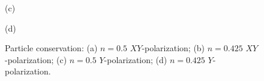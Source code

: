 \begin{figure}[h!]
\begin{minipage}[h]{0.5\linewidth}
\end{minipage}
\begin{minipage}[h]{0.5\linewidth}
 (c) \\
\end{minipage}
\hfill
\begin{minipage}[h]{0.5\linewidth}
 (d) \\
\end{minipage}
\caption{Particle conservation: (a) $n=0.5$ $XY$-polarization; (b) $n=0.425$ $XY$-polarization; (c) $n=0.5$ $Y$-polarization; (d) $n=0.425$ $Y$-polarization.}
\label{fig:Particle_conservation_t_tp}
\end{figure}

